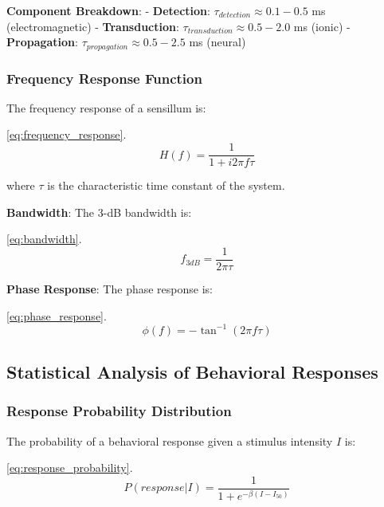 \documentclass[
  13pt,
  a4paperpaper,
  12pt]{article}
\begin{document}
\textbf{Component Breakdown}: - \textbf{Detection}:
\(\tau_{detection} \approx 0.1-0.5\) ms (electromagnetic) -
\textbf{Transduction}: \(\tau_{transduction} \approx 0.5-2.0\) ms
(ionic) - \textbf{Propagation}: \(\tau_{propagation} \approx 0.5-2.5\)
ms (neural)

\subsubsection{Frequency Response
Function}\label{frequency-response-function}

The frequency response of a sensillum is:

\eqref{eq:frequency_response}. \begin{equation}
H(f) = \frac{1}{1 + i2\pi f \tau} \label{eq:frequency_response}
\end{equation}

where \(\tau\) is the characteristic time constant of the system.

\textbf{Bandwidth}: The 3-dB bandwidth is:

\eqref{eq:bandwidth}. \begin{equation}
f_{3dB} = \frac{1}{2\pi \tau} \label{eq:bandwidth}
\end{equation}

\textbf{Phase Response}: The phase response is:

\eqref{eq:phase_response}. \begin{equation}
\phi(f) = -\tan^{-1}(2\pi f \tau) \label{eq:phase_response}
\end{equation}

\subsection{Statistical Analysis of Behavioral
Responses}\label{statistical-analysis-of-behavioral-responses}

\subsubsection{Response Probability
Distribution}\label{response-probability-distribution}

The probability of a behavioral response given a stimulus intensity
\(I\) is:

\eqref{eq:response_probability}. \begin{equation}
P(response|I) = \frac{1}{1 + e^{-\beta(I - I_{50})}} \label{eq:response_probability}
\end{equation}
\end{document}
